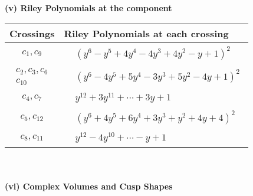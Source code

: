 \documentclass[1p]{elsarticle_modified}
\theoremstyle{definition}
\begin{document}
\newpage\renewcommand{\arraystretch}{1}
\flushleft \textbf{(v) Riley Polynomials at the component}\newline \\
\begin{tabular}{m{50pt}|m{274pt}}
Crossings & \hspace{64pt}Riley Polynomials at each crossing \\
\hline $$\begin{aligned}c_{1},c_{9}\end{aligned}$$&$\begin{aligned}
&(y^6- y^5+4 y^4-4 y^3+4 y^2- y+1)^2
\end{aligned}$\\
\hline $$\begin{aligned}c_{2},c_{3},c_{6}\\c_{10}\end{aligned}$$&$\begin{aligned}
&(y^6-4 y^5+5 y^4-3 y^3+5 y^2-4 y+1)^2
\end{aligned}$\\
\hline $$\begin{aligned}c_{4},c_{7}\end{aligned}$$&$\begin{aligned}
&y^{12}+3 y^{11}+\cdots+3 y+1
\end{aligned}$\\
\hline $$\begin{aligned}c_{5},c_{12}\end{aligned}$$&$\begin{aligned}
&(y^6+4 y^5+6 y^4+3 y^3+y^2+4 y+4)^2
\end{aligned}$\\
\hline $$\begin{aligned}c_{8},c_{11}\end{aligned}$$&$\begin{aligned}
&y^{12}-4 y^{10}+\cdots- y+1
\end{aligned}$\\
\hline
\end{tabular}\\~\\
\newpage\flushleft \textbf{(vi) Complex Volumes and Cusp Shapes}
\end{document}

